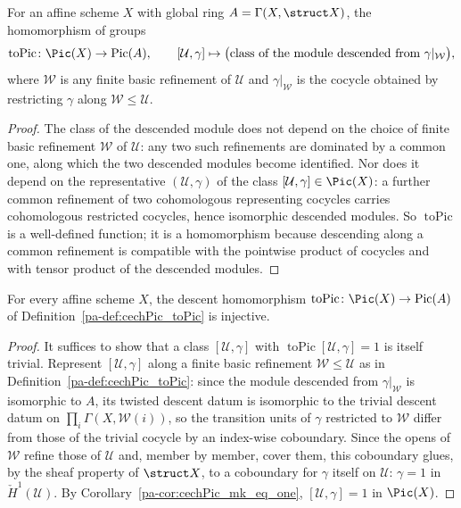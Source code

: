 \begin{definition}
  \label{pa-def:cechPic_toPic}
  \leanok

  For an affine scheme \(X\) with global ring \(A = \Gamma(X,\struct X)\), the homomorphism of
  groups
  \[
    \operatorname{toPic} \colon \Pic(X) \to \operatorname{Pic}(A), \qquad [\mathcal U,\gamma]
    \mapsto \bigl(\text{class of the module descended from } \gamma|_{\mathcal W}\bigr),
  \]
  where \(\mathcal W\) is any finite basic refinement of \(\mathcal U\) and
  \(\gamma|_{\mathcal W}\) is the cocycle obtained by restricting \(\gamma\) along
  \(\mathcal W \le \mathcal U\).
\end{definition}
\begin{proof}
  \leanok
  The class of the descended module does not depend on the choice of finite basic refinement
  \(\mathcal W\) of \(\mathcal U\): any two such refinements are dominated by a common one, along
  which the two descended modules become identified. Nor does it depend on the representative
  \((\mathcal U,\gamma)\) of the class \([\mathcal U,\gamma] \in \Pic(X)\): a further common
  refinement of two cohomologous representing cocycles carries cohomologous restricted
  cocycles, hence isomorphic descended modules. So \(\operatorname{toPic}\) is a well-defined
  function; it is a homomorphism because descending along a common refinement is compatible
  with the pointwise product of cocycles and with tensor product of the descended modules.
\end{proof}

\begin{theorem}
  \label{pa-thm:cechPic_toPic_injective}
  \leanok

  For every affine scheme \(X\), the descent homomorphism \(\operatorname{toPic} \colon
  \Pic(X) \to \operatorname{Pic}(A)\) of Definition~\ref{pa-def:cechPic_toPic} is injective.
\end{theorem}
\begin{proof}
  \leanok
  It suffices to show that a class \([\mathcal U,\gamma]\) with
  \(\operatorname{toPic}[\mathcal U,\gamma] = 1\) is itself trivial. Represent
  \([\mathcal U,\gamma]\) along a finite basic refinement \(\mathcal W \le \mathcal U\) as in
  Definition~\ref{pa-def:cechPic_toPic}: since the module descended from \(\gamma|_{\mathcal W}\)
  is isomorphic to \(A\), its twisted descent datum is isomorphic to the trivial descent datum
  on \(\prod_i \Gamma(X,\mathcal W(i))\), so the transition units of \(\gamma\) restricted to
  \(\mathcal W\) differ from those of the trivial cocycle by an index-wise coboundary. Since the
  opens of \(\mathcal W\) refine those of \(\mathcal U\) and, member by member, cover them, this
  coboundary glues, by the sheaf property of \(\struct X\), to a coboundary for \(\gamma\)
  itself on \(\mathcal U\): \(\gamma = 1\) in \(\check H^1(\mathcal U)\). By
  Corollary~\ref{pa-cor:cechPic_mk_eq_one}, \([\mathcal U,\gamma] = 1\) in \(\Pic(X)\).
\end{proof}

